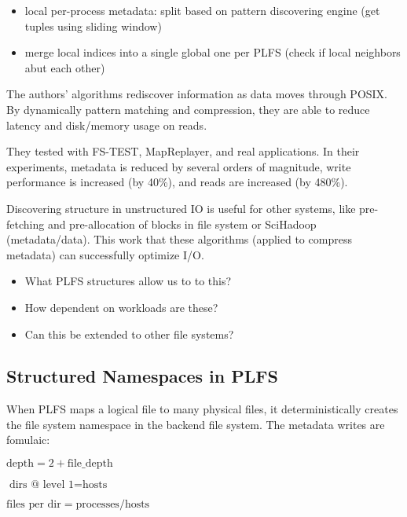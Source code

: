 \begin{itemize}

  \item local per-process metadata: split based on pattern discovering engine
  (get tuples using sliding window)

  \item merge local indices into a single global one per PLFS (check if local
  neighbors abut each other)

\end{itemize}

The authors' algorithms rediscover information as data moves through POSIX. By
dynamically  pattern matching and compression, they are able to reduce latency
and disk/memory usage on reads. 

They tested with FS-TEST, MapReplayer, and real applications. In their
experiments, metadata is reduced by several orders of magnitude, write
performance is increased (by 40\%), and reads are increased (by 480\%). 


Discovering structure in unstructured IO is useful for other systems, like
pre-fetching and pre-allocation of blocks in file system or SciHadoop
(metadata/data). This work that these algorithms (applied to compress metadata)
can successfully optimize I/O. 

\begin{itemize}

  \item What PLFS structures allow us to to this?

  \item How dependent on workloads are these?

  \item Can this be extended to other file systems?

\end{itemize}

\subsection{Structured Namespaces in PLFS}

When PLFS maps a logical file to many physical files, it deterministically
creates the file system namespace in the backend file system. The metadata
writes are fomulaic:

\(\text{depth} = 2 + \text{file\_depth}\)

\(\text{dirs @ level 1} = \text{hosts}\)

\(\text{files per dir} = \text{processes}/\text{hosts} \)


